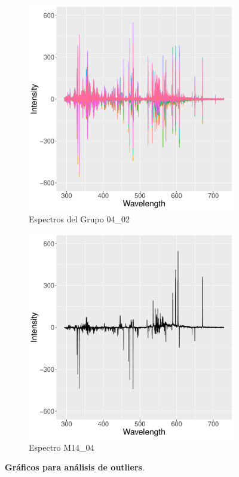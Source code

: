 \documentclass[12pt]{article}
\begin{document}
\begin{figure}[htbp]
    \centering
    \begin{subfigure}[b]{0.5\textwidth}
        \caption{Espectros del Grupo 04\_02}
        \includegraphics[width=\textwidth]{spectres_centered_04_02b.pdf}
    \end{subfigure}
    \begin{subfigure}[b]{0.5\textwidth}
        \caption{Espectro M14\_04}
        \includegraphics[width=\textwidth]{M14_04.pdf}
    \end{subfigure}
    \caption{\textbf{Gráficos para análisis de outliers}.}  
    \label{fig:outlier_analysis}
\end{figure}
\end{document}
